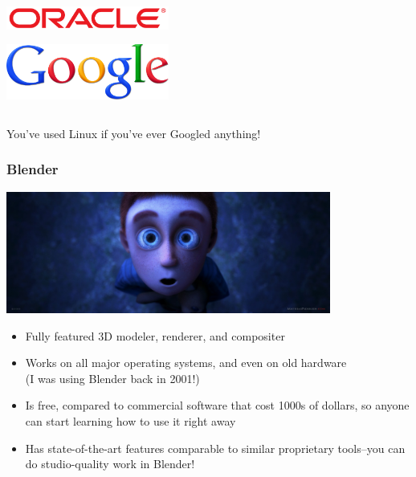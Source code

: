 \documentclass{beamer}
\begin{document}
\begin{frame}
\begin{columns}
\begin{center}
      \includegraphics[width=0.4\textwidth]{../img/oracle}

      \includegraphics[width=0.4\textwidth]{../img/google}
    \end{center}
  \end{columns}
  \begin{center}
    You've used Linux if you've ever Googled anything!
  \end{center}

\end{frame}

\begin{frame}
  \frametitle{Blender}
  \begin{center} \includegraphics[width=0.8\textwidth]{../img/blenderex} \end{center}
  \begin{itemize}
  \item Fully featured 3D modeler, renderer, and compositer
  \item Works on all major operating systems, and even on old hardware
    \\ (I was using Blender back in 2001!)
  \item Is free, compared to commercial software that cost 1000s of
    dollars, so anyone can start learning how to use it right away
  \item Has state-of-the-art features comparable to similar
    proprietary tools--you can do studio-quality work in Blender!
  \end{itemize}
\end{frame}
\end{document}
